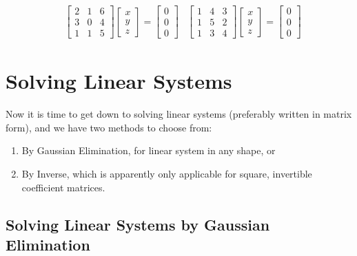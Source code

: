 \begin{align*}
&
\begin{bmatrix}
2 & 1 & 6 \\
3 & 0 & 4 \\
1 & 1 & 5 
\end{bmatrix}
\begin{bmatrix}
x \\
y \\
z
\end{bmatrix}
=
\begin{bmatrix}
0 \\
0 \\
0
\end{bmatrix}
&
\begin{bmatrix}
1 & 4 & 3 \\
1 & 5 & 2 \\
1 & 3 & 4 
\end{bmatrix}
\begin{bmatrix}
x \\
y \\
z
\end{bmatrix}
=
\begin{bmatrix}
0 \\
0 \\
0
\end{bmatrix}
\end{align*}

\section{Solving Linear Systems}
\label{section:SolveLinSys}
Now it is time to get down to solving linear systems (preferably written in matrix form), and we have two methods to choose from:
\begin{enumerate}
\item By Gaussian Elimination, for linear system in any shape, or
\item By Inverse, which is apparently only applicable for square, invertible coefficient matrices.
\end{enumerate}

\subsection{Solving Linear Systems by Gaussian Elimination}
\label{subsection:SolLinSysGauss}

